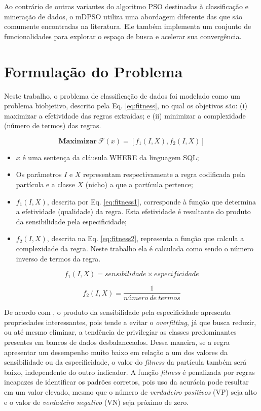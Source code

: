 \documentclass[
	12pt,				%
	openany,			%
	oneside,	
	a4paper,			%
	brazil,				%
	]{unimontes-ppgmsc-abntex2}
\begin{document}
Ao contrário de outras variantes do algoritmo PSO destinadas à classificação e mineração de dados, o mDPSO utiliza uma abordagem diferente das que são comumente encontradas na literatura. Ele também implementa um conjunto de funcionalidades para explorar o espaço de busca e acelerar sua convergência.

\section{Formulação do Problema}
\label{sec:form_problema}

Neste trabalho, o problema de classificação de dados foi modelado como um problema  biobjetivo, descrito pela Eq. \ref{eq:fitness}, no qual os objetivos são: (i) maximizar a efetividade das regras extraídas; e (ii) minimizar a complexidade (número de termos) das regras. 

\begin{equation}
\label{eq:fitness}
\textbf{Maximizar}\ \mathcal{F}(x) = [f_1(I,X), f_2(I,X)]
\end{equation}

\begin{itemize}
   \item $x$ é uma sentença da cláusula WHERE da linguagem SQL;
   \item Os parâmetros $I$ e $X$ representam respectivamente a regra codificada pela partícula e a classe $X$ (nicho) a que a partícula pertence;
   \item $f_1(I,X)$, descrita por Eq. \ref{eq:fitness1}, corresponde à função que determina a efetividade (qualidade) da regra. Esta efetividade é resultante do produto da sensibilidade pela especificidade; 
   \item $f_2(I,X)$, descrita na Eq. \ref{eq:fitness2}, representa a função que calcula a complexidade da regra. Neste trabalho ela é calculada como sendo o número inverso de termos da regra.
\end{itemize}

\begin{equation}
\label{eq:fitness1}
f_1(I,X) = sensibilidade \times especificidade
\end{equation}

\begin{equation}
\label{eq:fitness2}
f_2(I,X) = \frac{1}{número\ de\ termos}
\end{equation}

De acordo com , o produto da sensibilidade pela especificidade apresenta propriedades interessantes, pois tende a evitar o {\em overfitting}, já que busca reduzir, ou até mesmo eliminar, a tendência de privilegiar as classes predominantes presentes em bancos de dados desbalanceados. Dessa maneira, se a regra apresentar um desempenho muito baixo em relação a um dos valores da sensibilidade ou da especificidade, o valor do {\em fitness} da partícula também será baixo, independente do outro indicador. A função {\em fitness} é penalizada por regras incapazes de identificar os padrões corretos, pois uso da acurácia pode resultar em um valor elevado, mesmo que o número de {\em verdadeiro positivos} (VP) seja alto e o valor de {\em verdadeiro negativo} (VN) seja próximo de zero. 
\end{document}
